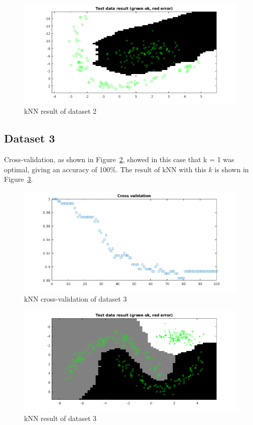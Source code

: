 \documentclass{article}
\begin{document}
\begin{figure}[h!]
    \includegraphics[width=13cm]{dataset2knnres.png}
    \caption{kNN result of dataset 2}
    \label{fig:knn2}
\end{figure}

\subsection{Dataset 3}

Cross-validation, as shown in Figure~\ref{fig:cv3}, showed in this
case that k = 1 was optimal, giving an accuracy of 100\%. 
The result of kNN with this $k$ is shown in Figure~\ref{fig:knn3}.

\begin{figure}[h!]
    \includegraphics[width=13cm]{dataset3knncv.png}
    \caption{kNN cross-validation of dataset 3}
    \label{fig:cv3}
\end{figure}

\begin{figure}[h!]
    \includegraphics[width=13cm]{dataset3knnres.png}
    \caption{kNN result of dataset 3}
    \label{fig:knn3}
\end{figure}
\end{document}
